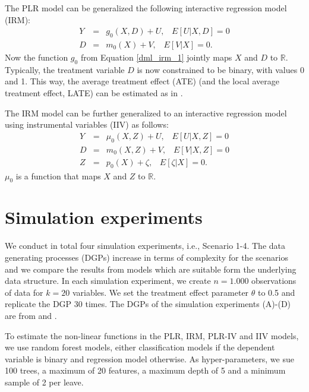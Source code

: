 \documentclass[10pt]{article}
\begin{document}
The PLR model can be generalized the following interactive regression model (IRM):
\begin{eqnarray*}\label{dml_irm_1}
	Y &=&  g_0(X,D) + U, \;\;\; E[U|X,D] =0  	\\ \label{dml_irm_2}
	D &=&  m_0(X) + V, \;\;\; E[V|X] =0  	.
\end{eqnarray*}
Now the function $g_0$ from Equation \eqref{dml_irm_1} jointly maps $X$ and $D$ to $\mathbb{R}$.
Typically, the treatment variable $D$ is now constrained to be binary, with values 0 and 1.
This way, the average treatment effect (ATE) (and the local average treatment effect, LATE) can be estimated as in \cite{Cher2018}.

The IRM model can be further generalized to an interactive regression model using instrumental variables (IIV) as follows:
\begin{eqnarray*}\label{dml_IIV_1}
	Y &=&  \mu_0(X,Z) + U, \;\;\; E[U|X,Z] =0  	\\ \label{dml_IIV_2}
	D &=&  m_0(X,Z) + V, \;\;\; E[V|X,Z] =0  		\\ \label{dml_IIV_3}
	Z &=&  p_0(X) + \zeta, \;\;\; E[\zeta|X] =0  	.
\end{eqnarray*}
$\mu_0$ is a function that maps $X$ and $Z$ to $\mathbb{R}$.



\section{Simulation experiments}
We conduct in total four simulation experiments, i.e., Scenario 1-4. 
The data generating processes (DGPs) increase in terms of complexity for the scenarios and we compare the results from models which are suitable form the underlying data structure.
In each simulation experiment, we create $n=1.000$ observations of data for $k=20$ variables.
We set the treatment effect parameter $\theta$ to 0.5 and replicate the DGP 30 times.
The DGPs of the simulation experiments (A)-(D) are from \cite{Bach2022} and \cite{Bach2021}.

To estimate the non-linear functions in the PLR, IRM, PLR-IV and IIV models, we use random forest models, either classification models if the dependent variable is binary and regression model otherwise.
As hyper-parameters, we sue  100 trees, a maximum of 20 features, a maximum depth of 5 and a minimum sample of 2 per leave.
\end{document}
